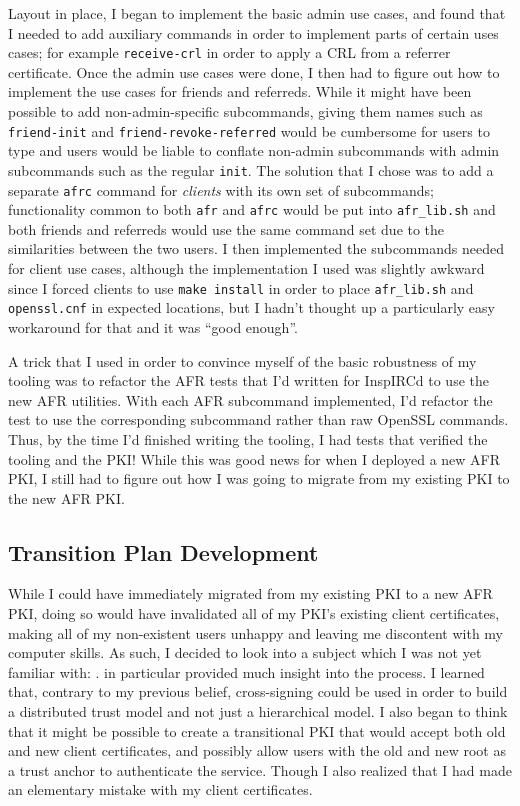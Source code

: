 \documentclass{article}
\begin{document}
Layout in place, I began to implement the basic admin use cases, and found that I needed to add auxiliary commands in order to implement parts of certain uses cases; for example \texttt{receive-crl} in order to apply a CRL from a referrer certificate.  Once the admin use cases were done, I then had to figure out how to implement the use cases for friends and referreds.  While it might have been possible to add non-admin-specific subcommands, giving them names such as \texttt{friend-init} and \texttt{friend-revoke-referred} would be cumbersome for users to type and users would be liable to conflate non-admin subcommands with admin subcommands such as the regular \texttt{init}.  The solution that I chose was to add a separate \texttt{afrc} command for \emph{clients} with its own set of subcommands; functionality common to both \texttt{afr} and \texttt{afrc} would be put into \texttt{afr_lib.sh} and both friends and referreds would use the same command set due to the similarities between the two users.  I then implemented the subcommands needed for client use cases, although the implementation I used was slightly awkward since I forced clients to use \texttt{make install} in order to place \texttt{afr_lib.sh} and \texttt{openssl.cnf} in expected locations, but I hadn't thought up a particularly easy workaround for that and it was ``good enough''.

A trick that I used in order to convince myself of the basic robustness of my tooling was to refactor the AFR tests that I'd written for InspIRCd to use the new AFR utilities.  With each AFR subcommand implemented, I'd refactor the test to use the corresponding subcommand rather than raw OpenSSL commands.  Thus, by the time I'd finished writing the tooling, I had tests that verified the tooling and the PKI!  While this was good news for when I deployed a new AFR PKI, I still had to figure out how I was going to migrate from my existing PKI to the new AFR PKI.

\subsection{Transition Plan Development}
While I could have immediately migrated from my existing PKI to a new AFR PKI, doing so would have invalidated all of my PKI's existing client certificates, making all of my non-existent users unhappy and leaving me discontent with my computer skills.  As such, I decided to look into a subject which I was not yet familiar with: .   in particular provided much insight into the process.  I learned that, contrary to my previous belief, cross-signing could be used in order to build a distributed trust model and not just a hierarchical model.  I also began to think that it might be possible to create a transitional PKI that would accept both old and new client certificates, and possibly allow users with the old and new root as a trust anchor to authenticate the service.  Though I also realized that I had made an elementary mistake with my client certificates.
\end{document}
